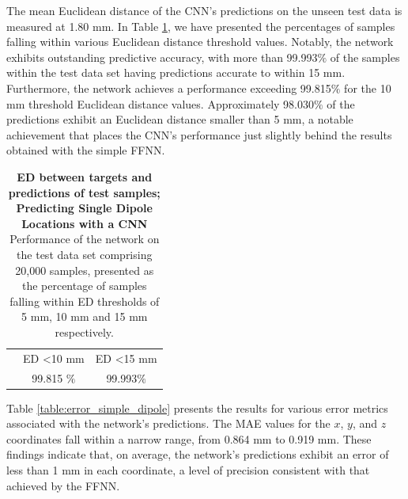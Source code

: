 \documentclass[a4paper, UKenglish, 11pt]{uiomaster}
\begin{document}
The mean Euclidean distance of the CNN's predictions on the unseen test data is measured at 1.80 mm. In Table \ref{table:MED}, we have presented the percentages of samples falling within various Euclidean distance threshold values. Notably, the network exhibits outstanding predictive accuracy, with more than 99.993$\%$ of the samples within the test data set having predictions accurate to within 15 mm. Furthermore, the network achieves a performance exceeding 99.815$\%$ for the 10 mm threshold Euclidean distance values. Approximately 98.030$\%$ of the predictions exhibit an Euclidean distance smaller than 5 mm, a notable achievement that places the CNN's performance just slightly behind the results obtained with the simple FFNN.


\begin{table}[]
  \centering
\begin{tabular}{|ccc|}
\hline
\rowcolor[HTML]{CBCEFB}
\multicolumn{3}{|c|}{\cellcolor[HTML]{CBCEFB}\textbf{Euclidian Distance for Test Samples}}                                                             \\ \hline
\rowcolor[HTML]{EFEFEF}
\multicolumn{1}{|c|}{\cellcolor[HTML]{EFEFEF}ED \textless 5 mm} & \multicolumn{1}{c|}{\cellcolor[HTML]{EFEFEF}ED \textless 10 mm} & ED \textless 15 mm \\ \hline
\rowcolor[HTML]{FFFFFF}
\multicolumn{1}{|c|}{\cellcolor[HTML]{FFFFFF}98.030 $\%$}       & \multicolumn{1}{c|}{\cellcolor[HTML]{FFFFFF}99.815 $\%$}        & 99.993$\%$        \\ \hline
\end{tabular}
\caption{\textbf{ED between targets and predictions of test samples; Predicting Single Dipole Locations with a CNN} \newline
Performance of the network on the test data set comprising 20,000 samples, presented as the percentage of samples falling within ED thresholds of 5 mm, 10 mm and 15 mm respectively.}
\label{table:MED}
\end{table}

\FloatBarrier


Table \ref{table:error_simple_dipole} presents the results for various error metrics associated with the network's predictions. The MAE values for the $x$, $y$, and $z$ coordinates fall within a narrow range, from 0.864 mm to 0.919 mm. These findings indicate that, on average, the network's predictions exhibit an error of less than 1 mm in each coordinate, a level of precision consistent with that achieved by the FFNN.
\end{document}
